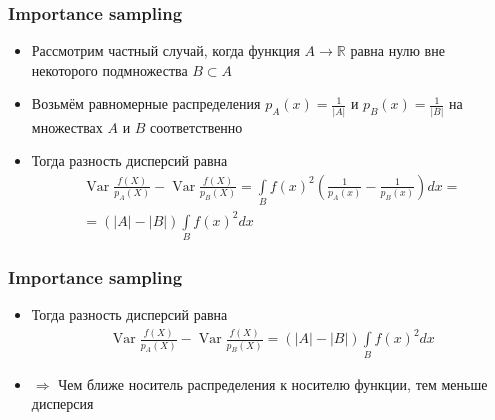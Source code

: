 \documentclass[10pt]{beamer}
\begin{document}
\begin{frame}
\frametitle{Importance sampling}
\begin{itemize}
\item Рассмотрим частный случай, когда функция \begin{math}A\rightarrow \mathbb R\end{math} равна нулю вне некоторого подмножества \begin{math}B\subset A\end{math}
\pause
\item Возьмём равномерные распределения \begin{math}p_A(x)=\frac{1}{|A|}\end{math} и \begin{math}p_B(x)=\frac{1}{|B|}\end{math} на множествах \begin{math}A\end{math} и \begin{math}B\end{math} соответственно
\pause
\item Тогда разность дисперсий равна
\begin{gather*}
\operatorname{Var}\frac{f(X)}{p_A(X)} - \operatorname{Var}\frac{f(X)}{p_B(X)} = \int\limits_B f(x)^2 \left(\frac{1}{p_A(x)} - \frac{1}{p_B(x)}\right)dx = \\
= (|A| - |B|) \int\limits_B f(x)^2 dx
\end{gather*}
\end{itemize}
\end{frame}

\begin{frame}
\frametitle{Importance sampling}
\begin{itemize}
\item Тогда разность дисперсий равна
\begin{gather*}
\operatorname{Var}\frac{f(X)}{p_A(X)} - \operatorname{Var}\frac{f(X)}{p_B(X)} = (|A| - |B|) \int\limits_B f(x)^2 dx
\end{gather*}
\pause
\item \begin{math}\Longrightarrow\end{math} Чем ближе носитель распределения к носителю функции, тем меньше дисперсия
\end{itemize}
\end{frame}
\end{document}
